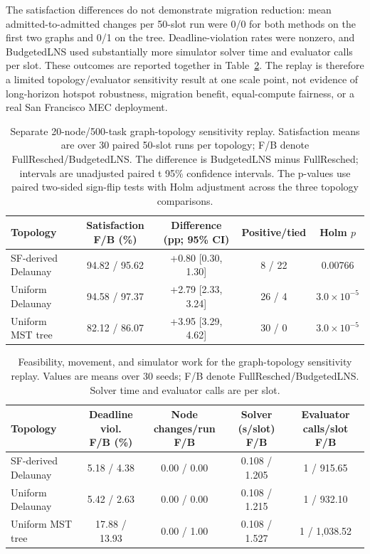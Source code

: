 \documentclass[preprint,12pt]{elsarticle}
\begin{document}
The satisfaction differences do not demonstrate migration reduction: mean
admitted-to-admitted changes per 50-slot run were 0/0 for both methods on the
first two graphs and 0/1 on the tree. Deadline-violation rates were nonzero,
and BudgetedLNS used substantially more simulator solver time and evaluator
calls per slot. These outcomes are reported together in
Table~\ref{tab:topology-sensitivity-cost}. The replay is therefore a limited
topology/evaluator sensitivity result at one scale point, not evidence of
long-horizon hotspot robustness, migration benefit, equal-compute fairness,
or a real San Francisco MEC deployment.

\begin{table}[H]\centering
\caption{Separate 20-node/500-task graph-topology sensitivity replay. Satisfaction means are over 30 paired 50-slot runs per topology; F/B denote FullResched/BudgetedLNS. The difference is BudgetedLNS minus FullResched; intervals are unadjusted paired t 95\% confidence intervals. The p-values use paired two-sided sign-flip tests with Holm adjustment across the three topology comparisons.}\label{tab:topology-sensitivity-service}
\scriptsize\setlength{\tabcolsep}{3pt}\renewcommand{\arraystretch}{1.12}
\begin{tabular}{lcccc}\toprule
Topology & Satisfaction F/B (\%) & Difference (pp; 95\% CI) & Positive/tied & Holm $p$ \\ \midrule
SF-derived Delaunay & 94.82 / 95.62 & +0.80 [0.30, 1.30] & 8 / 22 & 0.00766 \\
Uniform Delaunay & 94.58 / 97.37 & +2.79 [2.33, 3.24] & 26 / 4 & $3.0\times10^{-5}$ \\
Uniform MST tree & 82.12 / 86.07 & +3.95 [3.29, 4.62] & 30 / 0 & $3.0\times10^{-5}$ \\
\bottomrule\end{tabular}
\end{table}

\begin{table}[H]\centering
\caption{Feasibility, movement, and simulator work for the graph-topology sensitivity replay. Values are means over 30 seeds; F/B denote FullResched/BudgetedLNS. Solver time and evaluator calls are per slot.}\label{tab:topology-sensitivity-cost}
\scriptsize\setlength{\tabcolsep}{3pt}\renewcommand{\arraystretch}{1.12}
\begin{tabular}{lcccc}\toprule
Topology & \shortstack{Deadline viol.\\F/B (\%)} & \shortstack{Node changes/run\\F/B} & \shortstack{Solver (s/slot)\\F/B} & \shortstack{Evaluator calls/slot\\F/B} \\ \midrule
SF-derived Delaunay & 5.18 / 4.38 & 0.00 / 0.00 & 0.108 / 1.205 & 1 / 915.65 \\
Uniform Delaunay & 5.42 / 2.63 & 0.00 / 0.00 & 0.108 / 1.215 & 1 / 932.10 \\
Uniform MST tree & 17.88 / 13.93 & 0.00 / 1.00 & 0.108 / 1.527 & 1 / 1,038.52 \\
\bottomrule\end{tabular}
\end{table}
\end{document}
